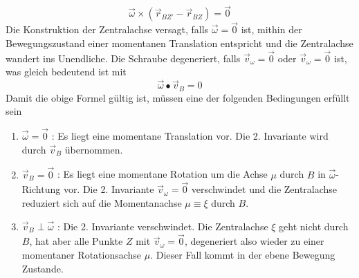 \begin{equation}
\boxed{\overrightarrow{\omega}\times \left(\overrightarrow{r}_{BZ'}-\overrightarrow{r}_{BZ}\right)=\overrightarrow{0}}
\end{equation}
Die Konstruktion der Zentralachse versagt, falls $\overrightarrow{\omega}=\overrightarrow{0}$ ist, mithin der Bewegungszustand einer momentanen Translation entspricht und die Zentralachse wandert ins Unendliche. Die Schraube degeneriert, falls $\overrightarrow{v}_{\omega}=\overrightarrow{0}$ oder $\overrightarrow{v}_{\omega}=\overrightarrow{0}$ ist, was gleich bedeutend ist mit
\begin{equation} 
\boxed{\overrightarrow{\omega}\bullet \overrightarrow{v}_B=0}
\end{equation}
Damit die obige Formel gültig ist, müssen eine der folgenden Bedingungen erfüllt sein
\begin{enumerate}[$(i)$] 
\item $\boxed{\overrightarrow{\omega}=\overrightarrow{0}}$ : Es liegt eine momentane Translation vor. Die 2. Invariante wird durch $\overrightarrow{v}_B$ übernommen.
\item $\boxed{\overrightarrow{v}_B=\overrightarrow{0}}$ : Es liegt eine momentane Rotation um die Achse $\mu$ durch $B$ in $\overrightarrow{\omega}$-Richtung vor. Die 2. Invariante $\overrightarrow{v}_{\omega}=\overrightarrow{0}$ verschwindet und die Zentralachse reduziert sich auf die Momentanachse $\mu\equiv\xi$ durch $B$.
\item $\boxed{\overrightarrow{v}_B\perp\overrightarrow{\omega}}$ : Die 2. Invariante verschwindet. Die Zentralachse $\xi$ geht nicht durch $B$, hat aber alle Punkte $Z$ mit $\overrightarrow{v}_{\omega}=\overrightarrow{0}$, degeneriert also wieder zu einer momentaner Rotationsachse $\mu$. Dieser Fall kommt in der ebene Bewegung Zustande. 
\end{enumerate}
